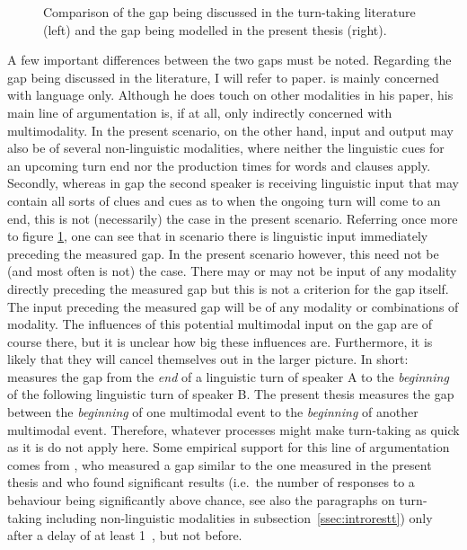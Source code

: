 \begin{figure}
	\centering
	
	\label{fig:gaps}
	\caption[Gap in the literature vs gap in the present thesis.]{Comparison of the gap being discussed in the turn-taking literature (left) and the gap being modelled in the present thesis (right).}
\end{figure}

A few important differences between the two gaps must be noted.
Regarding the gap being discussed in the literature, I will refer to  paper.
\citeauthor{levinson_turn-taking_2016} is mainly concerned with language only.
Although he does touch on other modalities in his paper, his main line of argumentation is, if at all, only indirectly concerned with multimodality.
In the present scenario, on the other hand, input and output may also be of several non-linguistic modalities, where neither the linguistic cues for an upcoming turn end nor the production times for words and clauses apply.
Secondly, whereas in  gap the second speaker is receiving linguistic input that may contain all sorts of clues and cues as to when the ongoing turn will come to an end, this is not (necessarily) the case in the present scenario.
Referring once more to figure \ref{fig:gaps}, one can see that in  scenario there is linguistic input immediately preceding the measured gap.
In the present scenario however, this need not be (and most often is not) the case.
There may or may not be input of any modality directly preceding the measured gap but this is not a criterion for the gap itself.
The input preceding the measured gap will be of any modality or combinations of modality.
The influences of this potential multimodal input on the gap are of course there, but it is unclear how big these influences are.
Furthermore, it is likely that they will cancel themselves out in the larger picture.
In short:
\citeauthor{levinson_turn-taking_2016} measures the gap from the \emph{end} of a linguistic turn of speaker A to the \emph{beginning} of the following linguistic turn of speaker B.
The present thesis measures the gap between the \emph{beginning} of one multimodal event to the \emph{beginning} of another multimodal event.
Therefore, whatever processes might make turn-taking as quick as it is do not apply here.
Some empirical support for this line of argumentation comes from \citet{vanegeren_mother-infant_2001}, who measured a gap similar to the one measured in the present thesis and who found significant results (i.e.~the number of responses to a behaviour being significantly above chance, see also the paragraphs on turn-taking including non-linguistic modalities in subsection~\ref{ssec:introrestt}) only after a delay of at least 1~\sone, but not before.

